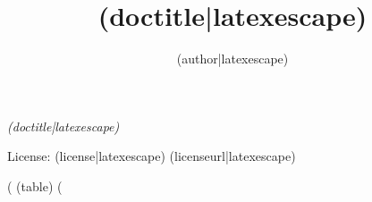 \documentclass[10pt,twoside,openright]{memoir}
\author{({author|latexescape})}
\title{({doctitle|latexescape})}
\date{}
\makeatletter
\def\maketitle{%
  \null
  \thispagestyle{empty}%
  \vfill
  \begin{center}\leavevmode
    \normalfont
    {\LARGE\raggedleft \@author\par}%
    \hrulefill\par
    {\huge\raggedright \@title\par}%
    \vskip 1cm
  \end{center}%
  \vfill
  \null
  \cleardoublepage
  }
\makeatother
\begin{document}
\let\cleardoublepage\clearpage


\maketitle






\frontmatter

\null\vfill

\begin{flushleft}
\textit{({doctitle|latexescape})}








\bigskip





License: ({license|latexescape})
({licenseurl|latexescape})



\end{flushleft}
\let\cleardoublepage\clearpage

\mainmatter
\sloppy
\noindent
\def\arraystretch{1.5}
\footnotesize

(%
  ({table})
(%
\end{document}
